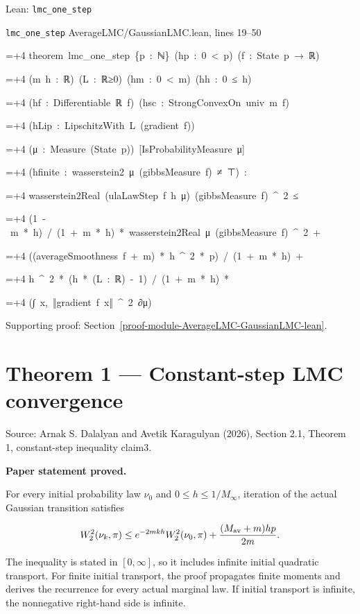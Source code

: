 \documentclass[11pt,a4paper]{report}
\newlength{\leancharwidth}
\newenvironment{leancode}{\par\smallskip\begingroup\ttfamily\footnotesize\raggedright
  \settowidth{\leancharwidth}{M}\setlength{\parskip}{0pt}\setlength{\parindent}{0pt}
  \frenchspacing}{\par\endgroup\smallskip}
\newcommand{\leanline}[2]{\hangindent=\dimexpr#1\leancharwidth+4\leancharwidth\relax
  \hangafter=1\noindent\hspace*{#1\leancharwidth}#2\par}
\newcommand{\leansource}[1]{\par{\footnotesize\color{leanmuted}#1}\par}
\begin{document}
\begin{leanbox}{Lean: \texttt{lmc\_\allowbreak{}one\_\allowbreak{}step}}
\leansource{\texttt{lmc\_\allowbreak{}one\_\allowbreak{}step} \quad AverageLMC/\allowbreak{}GaussianLMC.lean, lines 19–50}
\begin{leancode}
\leanline{0}{theorem\ lmc\_one\_step\ \{p\ :\ ℕ\}\ (hp\ :\ 0\ <\ p)\ (f\ :\ State\ p\ →\ ℝ)}
\leanline{4}{(m\ h\ :\ ℝ)\ (L\ :\ ℝ≥0)\ (hm\ :\ 0\ <\ m)\ (hh\ :\ 0\ ≤\ h)}
\leanline{4}{(hf\ :\ Differentiable\ ℝ\ f)\ (hsc\ :\ StrongConvexOn\ univ\ m\ f)}
\leanline{4}{(hLip\ :\ LipschitzWith\ L\ (gradient\ f))}
\leanline{4}{(μ\ :\ Measure\ (State\ p))\ [IsProbabilityMeasure\ μ]}
\leanline{4}{(hfinite\ :\ wasserstein2\ μ\ (gibbsMeasure\ f)\ ≠\ ⊤)\ :}
\leanline{4}{wasserstein2Real\ (ulaLawStep\ f\ h\ μ)\ (gibbsMeasure\ f)\ \textasciicircum{}\ 2\ ≤}
\leanline{6}{(1\ -\ m\ *\ h)\ /\ (1\ +\ m\ *\ h)\ *\ wasserstein2Real\ μ\ (gibbsMeasure\ f)\ \textasciicircum{}\ 2\ +}
\leanline{6}{((averageSmoothness\ f\ +\ m)\ *\ h\ \textasciicircum{}\ 2\ *\ p)\ /\ (1\ +\ m\ *\ h)\ +}
\leanline{6}{h\ \textasciicircum{}\ 2\ *\ (h\ *\ (L\ :\ ℝ)\ -\ 1)\ /\ (1\ +\ m\ *\ h)\ *}
\leanline{8}{(∫\ x,\ ‖gradient\ f\ x‖\ \textasciicircum{}\ 2\ ∂μ)}
\end{leancode}
\end{leanbox}

{\small\color{gray}Supporting proof: Section~\ref{proof-module-AverageLMC-GaussianLMC-lean}.\par}
\section{\texorpdfstring{Theorem 1 — Constant-step LMC convergence}{Theorem 1 — Constant-step LMC convergence}}


Source: Arnak S. Dalalyan and Avetik Karagulyan (2026), Section 2.1, Theorem 1, constant-step inequality claim3.



\textbf{Paper statement proved.}



For every initial probability law \(\nu_0\) and \(0\le h\le1/M_\infty\),
iteration of the actual Gaussian transition satisfies


\[W_2^2(\nu_k,\pi)\le e^{-2mkh}W_2^2(\nu_0,\pi)
+\frac{(M_{\rm av}+m)hp}{2m}.\]


The inequality is stated in \([0,\infty]\), so it includes infinite
initial quadratic transport. For finite initial transport, the proof propagates
finite moments and derives the recurrence for every actual marginal law. If
initial transport is infinite, the nonnegative right-hand side is infinite.
\end{document}
